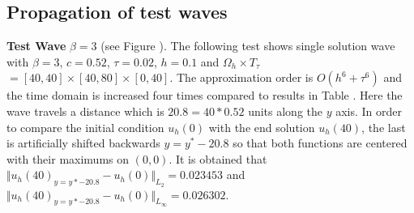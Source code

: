 \documentclass[11pt,a4paper,twoside]{article}
\begin{document}
\subsection{Propagation of test waves}
\textbf{Test Wave} {\boldmath$\beta = 3$} (see Figure ). The following test shows single solution wave with $\beta = 3$, $c = 0.52$, $\tau = 0.02$, $h = 0.1$ and $\Omega_h \times T_{\tau}$ $= [40, 40] \times [40, 80] \times [0, 40]$. The approximation order is $O(h^6 + \tau^6)$ and the time domain is increased four times compared to results in Table . Here the wave travels a distance which is $20.8 = 40*0.52$ units along the $y$ axis. In order to compare the initial condition $u_h(0)$ with the end solution $u_h(40)$, the last is artificially shifted backwards $y = y^* - 20.8$ so that both functions are centered with their maximums on $(0,0)$. It is obtained that $\Vert u_h(40)_{y = y*-20.8} - u_h(0) \Vert_{L_2} = 0.023453 $ and $\Vert u_h(40)_{y = y*-20.8} - u_h(0) \Vert_{L_\infty} = 0.026302$. 
\end{document}
